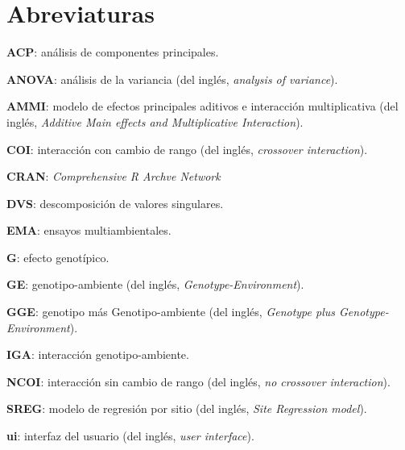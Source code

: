 

\chapter*{Abreviaturas}
\begin{description}
\item{\textbf{ACP}}: análisis de componentes principales.

\item{\textbf{ANOVA}}: análisis de la variancia (del inglés, \emph{analysis of variance}).

\item{\textbf{AMMI}}: modelo de efectos principales aditivos e interacción multiplicativa (del inglés, \emph{Additive Main effects and Multiplicative Interaction}).

\item{\textbf{COI}}: interacción con cambio de rango (del inglés, \emph{crossover interaction}).

\item{\textbf{CRAN}}: \emph{Comprehensive R Archve Network}

\item{\textbf{DVS}}: descomposición de valores singulares.

\item{\textbf{EMA}}: ensayos multiambientales.

\item{\textbf{G}}: efecto genotípico.

\item{\textbf{GE}}: genotipo-ambiente (del inglés, \emph{Genotype-Environment}).

\item{\textbf{GGE}}: genotipo más Genotipo-ambiente (del inglés, \emph{Genotype plus Genotype-Environment}).

\item{\textbf{IGA}}: interacción genotipo-ambiente.

\item{\textbf{NCOI}}: interacción sin cambio de rango (del inglés, \emph{no crossover interaction}).

\item{\textbf{SREG}}: modelo de regresión por sitio (del inglés, \emph{Site Regression model}).

\item{\textbf{ui}}: interfaz del usuario (del inglés, \emph{user interface}).


\end{description}
